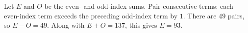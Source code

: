 Let $E$ and $O$ be the even- and odd-index sums. Pair consecutive terms: each even-index term exceeds the preceding odd-index term by $1$. There are $49$ pairs, so $E-O=49$. Along with $E+O=137$, this gives $\boxed{E=93}$.
